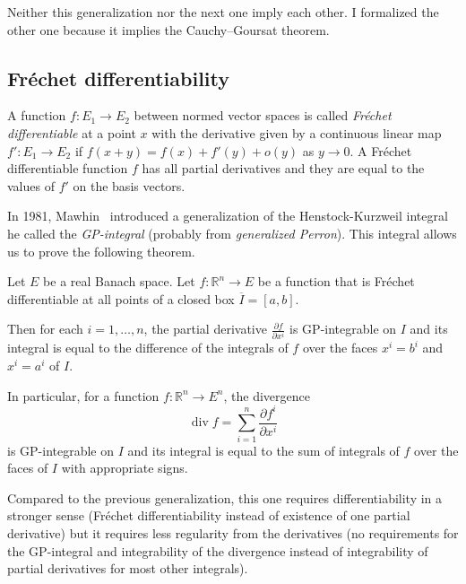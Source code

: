 \documentclass[a4paper, UKenglish,cleveref, autoref, thm-restate]{lipics-v2021}
\newcommand{\bbR}{\mathbb{R}}
\DeclareMathOperator{\divg}{div}
\begin{document}
Neither this generalization nor the next one imply each other. I
formalized the other one because it implies the Cauchy--Goursat theorem.

\subsection{Fréchet differentiability}
A function \(f\colon E_{1}\to E_{2}\) between normed vector spaces is
called \emph{Fréchet differentiable} at a point \(x\) with the
derivative given by a continuous linear map
\(f'\colon E_{1}\to E_{2}\) if \(f(x+y)=f(x)+f'(y)+o(y)\) as
\(y\to 0\). A Fréchet differentiable function \(f\) has all partial
derivatives and they are equal to the values of \(f'\) on the basis
vectors.

In 1981, Mawhin~\cite{Mawhin81} introduced a generalization of the
Henstock-Kurzweil integral he called the \emph{GP-integral} (probably
from \emph{generalized Perron}). This integral allows us to prove the
following theorem.

\begin{theorem}%
  [see~\cite{Mawhin81}]%
  \label{thm:divergence}
  Let \(E\) be a real Banach space. Let \(f\colon \bbR^{n}\to E\) be a
  function that is Fréchet differentiable at all points of a closed
  box \(\overline I=[a, b]\).

  Then for each \(i=1,\dots,n\), the partial derivative
  \(\frac{\partial f}{\partial x^{i}}\) is GP-integrable on \(I\) and
  its integral is equal to the difference of the integrals of \(f\) over
  the faces \(x^{i}=b^{i}\) and \(x^{i}=a^{i}\) of \(I\).

  In particular, for a function \(f\colon \bbR^{n}\to E^{n}\), the
  divergence
  \begin{equation}
    \label{eq:divg}
    \divg f=\sum_{i=1}^{n}\frac{\partial f^{i}}{\partial x^{i}}
  \end{equation}
  is GP-integrable on \(I\) and its integral is equal to the sum of
  integrals of \(f\) over the faces of \(I\) with appropriate signs.
\end{theorem}

Compared to the previous generalization, this one requires
differentiability in a stronger sense (Fréchet differentiability
instead of existence of one partial derivative) but it requires less
regularity from the derivatives (no requirements for the GP-integral
and integrability of the divergence instead of integrability of
partial derivatives for most other integrals).
\end{document}
